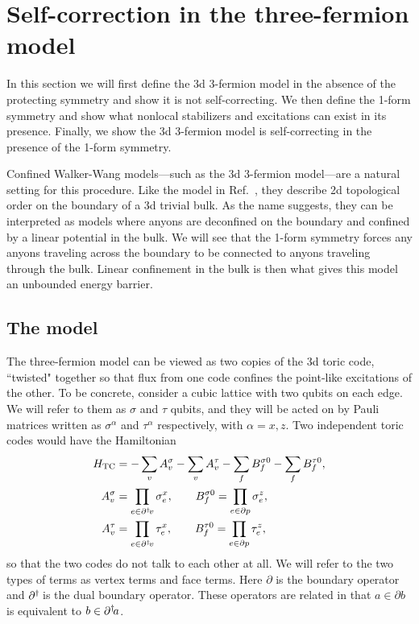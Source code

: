 \section{Self-correction in the three-fermion model}
	
In this section we will first define the 3d 3-fermion model in the absence of the protecting symmetry and show it is not self-correcting. We then define the 1-form symmetry and show what nonlocal stabilizers and excitations can exist in its presence. Finally, we show the 3d 3-fermion model is self-correcting in the presence of the 1-form symmetry.

Confined Walker-Wang models---such as the 3d 3-fermion model---are a natural setting for this procedure. Like the model in Ref.~\cite{RobertsBartlett2020}, they describe 2d topological order on the boundary of a 3d trivial bulk. As the name suggests, they can be interpreted as models where anyons are deconfined on the boundary and confined by a linear potential in the bulk. We will see that the 1-form symmetry forces any anyons traveling across the boundary to be connected to anyons traveling through the bulk. Linear confinement in the bulk is then what gives this model an unbounded energy barrier.
	
\subsection{The model}

The three-fermion model can be viewed as two copies of the 3d toric code, ``twisted" together so that flux from one code confines the point-like excitations of the other. To be concrete, consider a cubic lattice with two qubits on each edge. We will refer to them as $\sigma$ and $\tau$ qubits, and they will be acted on by Pauli matrices written as $\sigma^\alpha$ and $\tau^\alpha$ respectively, with $\alpha = x,z$. Two independent toric codes would have the Hamiltonian 
\begin{align}
H_{\text{TC}} &= -\sum_vA_v^{\sigma}-\sum_vA_v^{\tau}-\sum_fB_f^{\sigma0}-\sum_fB_f^{\tau0},\nonumber\\
A_v^{\sigma} &= \prod_{e\in \partial^\dagger\! v}\sigma_e^x, \qquad B_f^{\sigma0} = \prod_{e\in\partial p}\sigma_e^z,\nonumber\\
A_v^{\tau} &= \prod_{e\in \partial^\dagger\! v}\tau_e^x, \qquad B_f^{\tau0} = \prod_{e\in\partial p}\tau_e^z, \label{eqn:toric}
\end{align}
so that the two codes do not talk to each other at all. We will refer to the two types of terms as vertex terms and face terms. Here $\partial$ is the boundary operator and $\partial^\dagger\!$ is the dual boundary operator. These operators are related in that $a\in\partial b$ is equivalent to $b\in\partial^\dagger\! a$.
	
